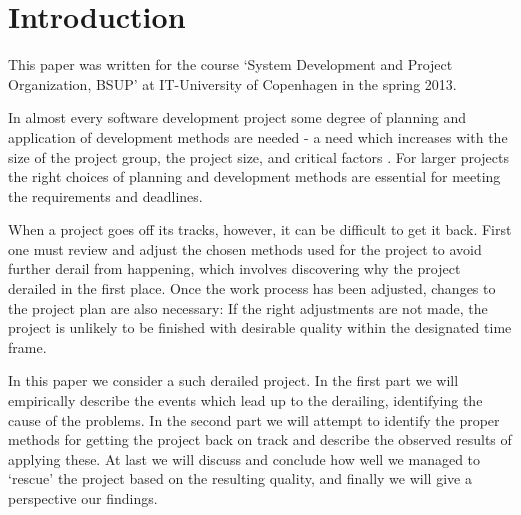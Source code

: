 \section{Introduction}
This paper was written for the course `System Development and Project Organization, BSUP' at IT-University of Copenhagen in the spring 2013.

In almost every software development project some degree of planning and application of development methods are needed - a need which increases with the size of the project group, the project size, and critical factors \cite[p. 134]{ac}. For larger projects the right choices of planning and development methods are essential for meeting the requirements and deadlines.

When a project goes off its tracks, however, it can be difficult to get it back. First one must review and adjust the chosen methods used for the project to avoid further derail from happening, which involves discovering why the project derailed in the first place.
Once the work process has been adjusted, changes to the project plan are also necessary: If the right adjustments are not made, the project is unlikely to be finished with desirable quality within the designated time frame.

In this paper we consider a such derailed project.
In the first part we will empirically describe the events which lead up to the derailing, identifying the cause of the problems. In the second part we will attempt to identify the proper methods for getting the project back on track and describe the observed results of applying these. At last we will discuss and conclude how well we managed to `rescue' the project based on the resulting quality, and finally we will give a perspective our findings.